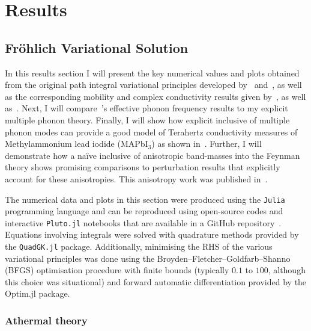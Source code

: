 \chapter{Results}

\section{Fr\"ohlich Variational Solution}

In this results section I will present the key numerical values and plots obtained from the original path integral variational principles developed by~\cite{feynman_slow_1955} and~\cite{osaka_polaron_1959}, as well as the corresponding mobility and complex conductivity results given by~\cite{feynman_mobility_1962}, as well as~\cite{devreese_optical_1972}. Next, I will compare~\cite{hellwarth_mobility_1999}'s effective phonon frequency results to my explicit multiple phonon theory. Finally, I will show how explicit inclusive of multiple phonon modes can provide a good model of Terahertz conductivity measures of Methylammonium lead iodide (MAPbI$_3$) as shown in~\cite{zheng_multipulse_2021}. Further, I will demonstrate how a na\"ive inclusive of anisotropic band-masses into the Feynman theory shows promising comparisons to perturbation results that explicitly account for these anisotropies. This anisotropy work was published in~\cite{guster_frohlich_2021}. 

The numerical data and plots in this section were produced using the \texttt{Julia} programming language and can be reproduced using open-source codes and interactive \texttt{Pluto.jl} notebooks that are available in a GitHub repository~\cite{frost_jarvistpolaronmobilityjl_2023}. Equations involving integrals were solved with quadrature methods provided by the \texttt{QuadGK.jl} package. Additionally, minimising the RHS of the various variational principles was done using the Broyden–Fletcher–Goldfarb–Shanno (BFGS) optimisation procedure with finite bounds (typically $0.1$ to $100$, although this choice was situational) and forward automatic differentiation provided by the Optim.jl package.

\subsection{Athermal theory}

